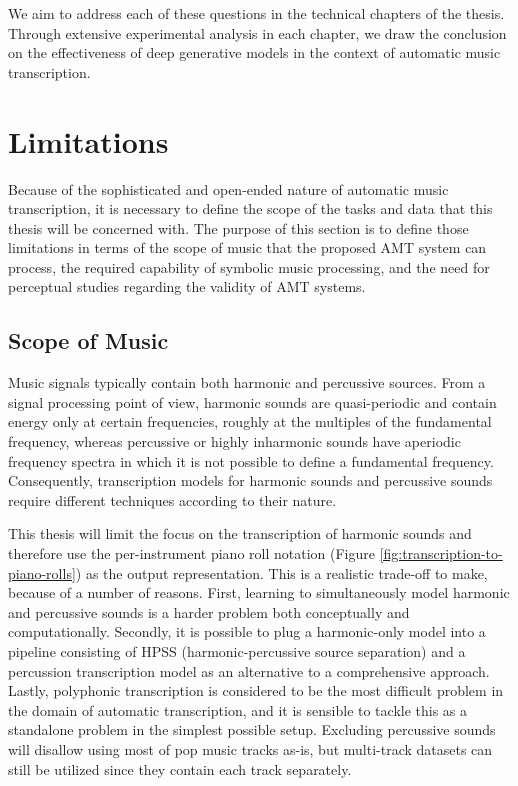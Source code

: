 We aim to address each of these questions in the technical chapters of the thesis.
Through extensive experimental analysis in each chapter, we draw the conclusion on the effectiveness of deep generative models in the context of automatic music transcription.


\section{Limitations}\label{sec:limitations}

Because of the sophisticated and open-ended nature of automatic music transcription, it is necessary to define the scope of the tasks and data that this thesis will be concerned with.
The purpose of this section is to define those limitations in terms of the scope of music that the proposed AMT system can process, the required capability of symbolic music processing, and the need for perceptual studies regarding the validity of AMT systems.


\subsection{Scope of Music}

Music signals typically contain both harmonic and percussive sources. 
From a signal processing point of view, harmonic sounds are quasi-periodic and contain energy only at certain frequencies, roughly at the multiples of the fundamental frequency, whereas percussive or highly inharmonic sounds have aperiodic frequency spectra in which it is not possible to define a fundamental frequency.
Consequently, transcription models for harmonic sounds and percussive sounds require different techniques according to their nature.


This thesis will limit the focus on the transcription of harmonic sounds and therefore use the per-instrument piano roll notation (Figure \ref{fig:transcription-to-piano-rolls}) as the output representation.
This is a realistic trade-off to make, because of a number of reasons.
First, learning to simultaneously model harmonic and percussive sounds is a harder problem both conceptually and computationally.
Secondly, it is possible to plug a harmonic-only model into a pipeline consisting of HPSS (harmonic-percussive source separation) and a percussion transcription model as an alternative to a comprehensive approach.
Lastly, polyphonic transcription is considered to be the most difficult problem in the domain of automatic transcription, and it is sensible to tackle this as a standalone problem in the simplest possible setup.
Excluding percussive sounds will disallow using most of pop music tracks as-is, but multi-track datasets can still be utilized since they contain each track separately.


